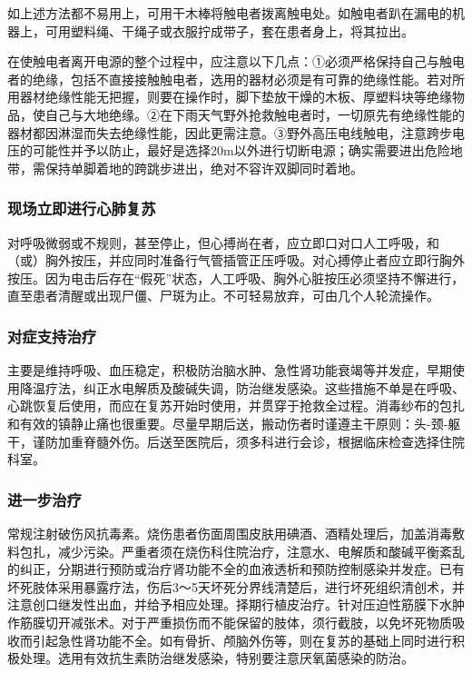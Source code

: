 如上述方法都不易用上，可用干木棒将触电者拨离触电处。如触电者趴在漏电的机器上，可用塑料绳、干绳子或衣服拧成带子，套在患者身上，将其拉出。

在使触电者离开电源的整个过程中，应注意以下几点：①必须严格保持自己与触电者的绝缘，包括不直接接触触电者，选用的器材必须是有可靠的绝缘性能。若对所用器材绝缘性能无把握，则要在操作时，脚下垫放干燥的木板、厚塑料块等绝缘物品，使自己与大地绝缘。②在下雨天气野外抢救触电者时，一切原先有绝缘性能的器材都因淋湿而失去绝缘性能，因此更需注意。③野外高压电线触电，注意跨步电压的可能性并予以防止，最好是选择20m以外进行切断电源；确实需要进出危险地带，需保持单脚着地的跨跳步进出，绝对不容许双脚同时着地。

\subsubsection{现场立即进行心肺复苏}

对呼吸微弱或不规则，甚至停止，但心搏尚在者，应立即口对口人工呼吸，和（或）胸外按压，并应同时准备行气管插管正压呼吸。对心搏停止者应立即行胸外按压。因为电击后存在“假死”状态，人工呼吸、胸外心脏按压必须坚持不懈进行，直至患者清醒或出现尸僵、尸斑为止。不可轻易放弃，可由几个人轮流操作。

\subsubsection{对症支持治疗}

主要是维持呼吸、血压稳定，积极防治脑水肿、急性肾功能衰竭等并发症，早期使用降温疗法，纠正水电解质及酸碱失调，防治继发感染。这些措施不单是在呼吸、心跳恢复后使用，而应在复苏开始时使用，并贯穿于抢救全过程。消毒纱布的包扎和有效的镇静止痛也很重要。尽量早期后送，搬动伤者时谨遵主干原则：头-颈-躯干，谨防加重脊髓外伤。后送至医院后，须多科进行会诊，根据临床检查选择住院科室。

\subsubsection{进一步治疗}

常规注射破伤风抗毒素。烧伤患者伤面周围皮肤用碘酒、酒精处理后，加盖消毒敷料包扎，减少污染。严重者须在烧伤科住院治疗，注意水、电解质和酸碱平衡紊乱的纠正，分期进行预防或治疗肾功能不全的血液透析和预防控制感染并发症。已有坏死肢体采用暴露疗法，伤后3～5天坏死分界线清楚后，进行坏死组织清创术，并注意创口继发性出血，并给予相应处理。择期行植皮治疗。针对压迫性筋膜下水肿作筋膜切开减张术。对于严重损伤而不能保留的肢体，须行截肢，以免坏死物质吸收而引起急性肾功能不全。如有骨折、颅脑外伤等，则在复苏的基础上同时进行积极处理。选用有效抗生素防治继发感染，特别要注意厌氧菌感染的防治。

